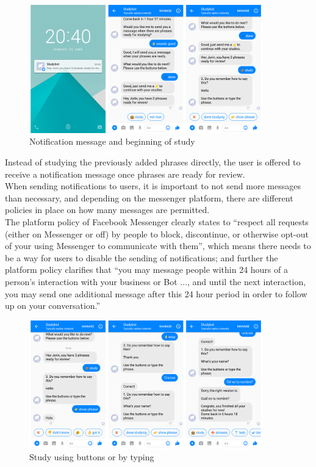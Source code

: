 \begin{figure}[h]
  \centering
  \includegraphics[width=0.9\textwidth]{images/interface/07-notify-study.png}
	\caption{Notification message and beginning of study}
	\label{fig:07-notify-study}
\end{figure}

Instead of studying the previously added phrases directly,
the user is offered to receive a notification message once phrases are ready for review.
\\

When sending notifications to users, it is important to not send more messages than necessary,
and depending on the messenger platform, there are different policies in place on how many messages are permitted.
\\
The platform policy of Facebook Messenger clearly states to
``respect all requests (either on Messenger or off) by people to block, discontinue, or otherwise opt-out of your using Messenger to communicate with them''\cite{fbpolicy},
which means there needs to be a way for users to disable the sending of notifications;
and further the platform policy clarifies that ``you may message people within 24 hours of a person's interaction with your business or Bot ..., and until the next interaction, you may send one additional message after this 24 hour period in order to follow up on your conversation.''\cite{fbpolicy}
\\

\begin{figure}[h]
  \centering
  \includegraphics[width=0.9\textwidth]{images/interface/08-study-done.png}
	\caption{Study using buttons or by typing}
	\label{fig:08-study-done}
\end{figure}

